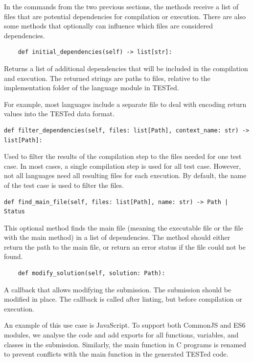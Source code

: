 \documentclass[../main]{subfiles}
\begin{document}
In the commands from the two previous sections, the methods receive a list of files that are potential dependencies for compilation or execution.
There are also some methods that optionally can influence which files are considered dependencies.

\begin{verbatim}
    def initial_dependencies(self) -> list[str]:
\end{verbatim}

Returns a list of additional dependencies that will be included in the compilation and execution.
The returned strings are paths to files, relative to the implementation folder of the language module in TESTed.

For example, most languages include a separate file to deal with encoding return values into the TESTed data format.

\begin{verbatim}
def filter_dependencies(self, files: list[Path], context_name: str) -> list[Path]:
\end{verbatim}

Used to filter the results of the compilation step to the files needed for one test case.
In most cases, a single compilation step is used for all test case.
However, not all languages need all resulting files for each execution.
By default, the name of the test case is used to filter the files.

\begin{verbatim}
def find_main_file(self, files: list[Path], name: str) -> Path | Status
\end{verbatim}

This optional method finds the main file (meaning the executable file or the file with the main method) in a list of dependencies.
The method should either return the path to the main file, or return an error status if the file could not be found.

\begin{verbatim}
    def modify_solution(self, solution: Path):
\end{verbatim}

A callback that allows modifying the submission.
The submission should be modified in place.
The callback is called after linting, but before compilation or execution.

An example of this use case is JavaScript.
To support both CommonJS and ES6 modules, we analyse the code and add exports for all functions, variables, and classes in the submission.
Similarly, the main function in C programs is renamed to prevent conflicts with the main function in the generated TESTed code.
\end{document}
